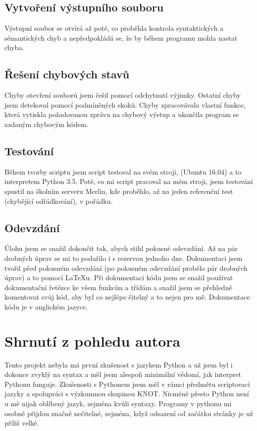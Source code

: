 \documentclass[a4paper, 10pt]{article}
\begin{document}
        \subsection{Vytvoření výstupního souboru}
            Výstupní soubor se otvírá až poté, co proběhla kontrola syntaktických
            a sémantických chyb a nepředpokládá se, že by během programu mohla nastat
            chyba.
        \subsection{Řešení chybových stavů}
            Chyby otevření souborů jsem češil pomocí odchytnutí výjimky. Ostatní
            chyby jsem detekoval pomocí podmíněných skoků. Chyby zpracovávala
            vlastní funkce, která vytiskla požadovanou zprávu na chybový výstup
            a ukončila program se zadaným chybovým kódem.
        \subsection{Testování}
            Během tvorby scriptu jsem script testoval na svém stroji, (Ubuntu 16.04)
            a to interpretem Python 3.5. Poté, co mi script pracoval na mém stroji,
            jsem testování spustil na školním serveru Merlin, kde proběhlo, až na
            jeden referenční test (chybějící odřádkování), v pořádku.
        \subsection{Odevzdání}
            Úlohu jsem se snažil dokončit tak, abych stihl pokusné odevzdání.
            Až na pár drobných úprav se mi to podařilo i s rezervou jednoho dne.
            Dokumentaci jsem tvořil před pokusném odevzdání (po pokusném odevzdání
            probělo pár drobných úprav) a to pomocí \LaTeX u. Při dokumentaci
            kódu jsem se snažil používat dokumentační řetězce ke všem funkcím a
            třídám a snažil jsem se přehledně komentovat svůj kód, aby byl co
            nejlépe čitelný a to nejen pro mě. Dokumentace kódu je v anglickém
            jazyce.

    \section{Shrnutí z pohledu autora}
        Tento projekt nebyla má první zkušenost s jazykem Python a už jsem byl
        i dokonce zvyklý na syntax a měl jsem alespoň minimální vědomí, jak
        interpret Pythonu funguje. Zkušenosti s Pythonem jsem měl v rámci předmětu
        scriptovací jazyky a spolupráci s výzkumnou skupinou KNOT. Nicméně přesto
        Python není u mě nijak oblíbený jazyk, zejména kvůli syntaxy. Programy v
        pythonu mi osobně přijdou značně nečitelné, zejména, když odsazení
        od začátku stránky je už příliš velké.
\end{document}
